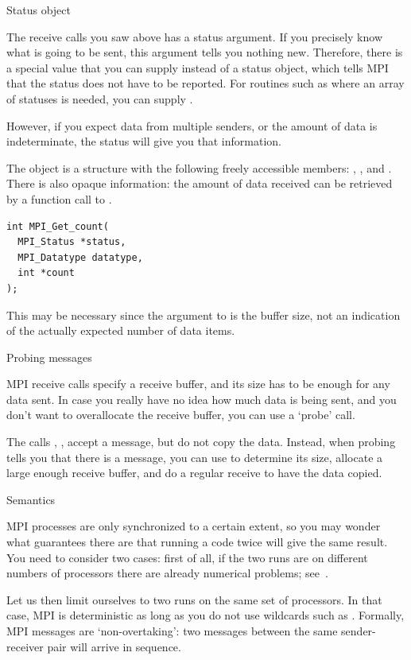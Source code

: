  {Status object}

The receive calls you saw above has a status argument. If you 
precisely know what is going to be sent, this argument tells you 
nothing new. Therefore, there is a special value 
that you can supply instead of a status object, which tells MPI that the 
status does not have to be reported. For routines such as 
where an array of statuses is needed, you can supply .

However, if you expect data from multiple senders,
or the amount of data is indeterminate, the status will give
you that information.

The  object is a structure with the following 
freely accessible members:
, , and . There is also opaque 
information: the amount of data received can be retrieved by 
a function call to .
\begin{verbatim}
int MPI_Get_count(
  MPI_Status *status,
  MPI_Datatype datatype,
  int *count
);
\end{verbatim}
This may be necessary since the  argument to  is 
the buffer size, not an indication of the actually expected number of
data items.

 {Probing messages}

MPI receive calls specify a receive buffer, and its size has to be
enough for any data sent. In case you really have no idea how much data
is being sent, and you don't want to overallocate the receive buffer,
you can use a `probe' call.

The calls , , accept a message,
but do not copy the data. Instead, when probing tells you that there is a
message, you can use  to determine its size,
allocate a large enough receive buffer, and do a regular receive to
have the data copied.

 {Semantics}
\label{sec:mpi-semantics}

MPI processes are only synchronized to a certain extent, so you may
wonder what guarantees there are that running a code twice will give
the same result.  You need to consider two cases: first of all, if the
two runs are on different numbers of processors there are already
numerical problems; see~.

Let us then limit ourselves to two runs on the same set of processors. 
In that case, MPI is deterministic as long as you do not use 
wildcards such as . Formally, 
MPI messages are `non-overtaking': two messages between the same
sender-receiver pair will arrive in sequence.

